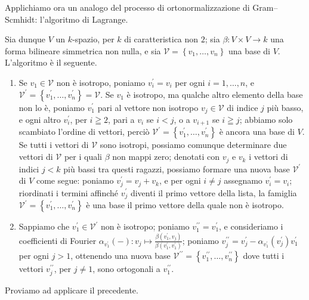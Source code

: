 \documentclass[a4paper]{amsproc}
\theoremstyle{plain}
\theoremstyle{definition}
\theoremstyle{remark}
\begin{document}
Applichiamo ora un analogo del processo di ortonormalizzazione di Gram--Scmhidt: l'algoritmo di Lagrange.

Sia dunque $ V $ un $ k $-spazio, per $ k $ di caratteristica non $ 2 $; sia $ \beta\colon V\times V\to k $ una forma bilineare simmetrica non nulla, e sia $ \mathcal V = \left\{v_1,\dots,v_n\right\} $ una base di $ V $. L'algoritmo è il seguente.
\begin{enumerate}[1.]
\item Se $ v_1\in\mathcal V $ non è isotropo, poniamo $ v_i^\prime = v_i $ per ogni $ i = 1,\dots,n $, e $ \mathcal V^\prime = \left\{v_1^\prime,\dots,v_n^\prime\right\} = \mathcal V $. Se $ v_1 $ è isotropo, ma qualche altro elemento della base non lo è, poniamo $ v_1^\prime $ pari al vettore non isotropo $ v_j\in\mathcal V $ di indice $ j $ più basso, e ogni altro $ v_i^\prime $, per $ i\geqq 2 $, pari a $ v_i $ se $ i<j $, o a $ v_{i + 1} $ se $ i\geqq j $; abbiamo solo scambiato l'ordine di vettori, perciò $ \mathcal V^\prime = \left\{v_1^\prime,\dots,v_n^\prime\right\} $ è ancora una base di $ V $. Se tutti i vettori di $ \mathcal V $ sono isotropi, possiamo comunque determinare due vettori di $ \mathcal V $ per i quali $ \beta $ non mappi zero; denotati con $ v_j $ e $ v_k $ i vettori di indici $ j<k $ più bassi tra questi ragazzi, possiamo formare una nuova base $ \mathcal V^\prime $ di $ V $ come segue: poniamo $ v_j^\prime = v_j + v_k $, e per ogni $ i\neq j $ assegnamo $ v_i^\prime = v_i $; riordinati i termini affinché $ v_j^\prime $ diventi il primo vettore della lista, la famiglia $ \mathcal V^\prime = \left\{v_1^\prime,\dots,v_n^\prime\right\} $ è una base il primo vettore della quale non è isotropo.
\item Sappiamo che $ v_1^\prime\in\mathcal V^\prime $ non è isotropo; poniamo $ v_1^{\prime\prime} = v_1^\prime $, e consideriamo i coefficienti di Fourier $ \alpha_{v_1^\prime}({-})\colon v_j\mapsto \frac{\beta(v_1^\prime,v_j)}{\beta(v_1^\prime,v_1^\prime)} $; poniamo $ v_j^{\prime\prime} = v_j^\prime - \alpha_{v_1^\prime}(v_j^\prime)v_1^\prime $ per ogni $ j>1 $, ottenendo una nuova base $ \mathcal V^{\prime\prime} = \left\{v_1^{\prime\prime},\dots,v_n^{\prime\prime}\right\} $ dove tutti i vettori $ v_j^{\prime\prime} $, per $ j\neq 1 $, sono ortogonali a $ v_1^{\prime\prime} $.
\end{enumerate}

Proviamo ad applicare il precedente.
\end{document}
